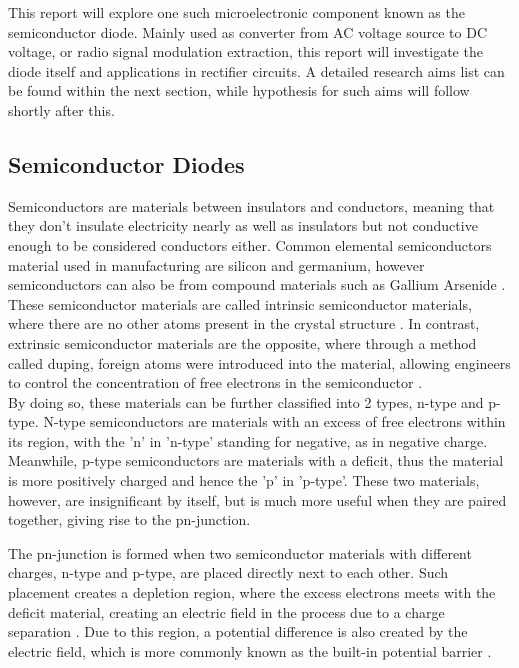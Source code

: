 \documentclass[11pt]{report}
\begin{document}
This report will explore one such microelectronic component known as the semiconductor diode. Mainly used as converter from AC voltage source to DC voltage, or radio signal modulation extraction, this report will investigate the diode itself and applications in rectifier circuits. A detailed research aims list can be found within the next section, while hypothesis for such aims will follow shortly after this.

\subsection{Semiconductor Diodes}
Semiconductors are materials between insulators and conductors, meaning that they don't insulate electricity nearly as well as insulators but not conductive enough to be considered conductors either. Common elemental semiconductors material used in manufacturing are silicon and germanium, however semiconductors can also be from compound materials such as Gallium Arsenide \autocite{neamenMicroelectronicsCircuitAnalysis2007}. These semiconductor materials are called intrinsic semiconductor materials, where there are no other atoms present in the crystal structure \autocite{neamenMicroelectronicsCircuitAnalysis2007}. In contrast, extrinsic semiconductor materials are the opposite, where through a method called duping, foreign atoms were introduced into the material, allowing engineers to control the concentration of free electrons in the semiconductor \autocite{neamenMicroelectronicsCircuitAnalysis2007}. \\

By doing so, these materials can be further classified into 2 types, n-type and p-type. N-type semiconductors are materials with an excess of free electrons within its region, with the 'n' in 'n-type' standing for negative, as in negative charge. Meanwhile, p-type semiconductors are materials with a deficit, thus the material is more positively charged and hence the 'p' in 'p-type'. These two materials, however, are insignificant by itself, but is much more useful when they are paired together, giving rise to the pn-junction.

The pn-junction is formed when two semiconductor materials with different charges, n-type and p-type, are placed directly next to each other. Such placement creates a depletion region, where the excess electrons meets with the deficit material, creating an electric field in the process due to a charge separation \autocite{neamenMicroelectronicsCircuitAnalysis2007}. Due to this region, a potential difference is also created by the electric field, which is more commonly known as the built-in potential barrier \autocite{neamenMicroelectronicsCircuitAnalysis2007}.
\end{document}
